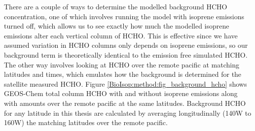     
    There are a couple of ways to determine the modelled background HCHO concentration, one of which involves running the model with isoprene emissions turned off, which allows us to see exactly how much the modelled isoprene emissions alter each vertical column of HCHO.
    This is effective since we have assumed variation in HCHO columns only depends on isoprene emissions, so our background term is theoretically identical to the emission free simulated HCHO.
    The other way involves looking at HCHO over the remote pacific at matching latitudes and times, which emulates how the background is determined for the satellite measured HCHO.
    Figure \ref{BioIsop:method:fig_background_hcho} shows GEOS-Chem total column HCHO with and without isoprene emissions along with amounts over the remote pacific at the same latitudes.
    Background HCHO for any latitude in this thesis are calculated by averaging longitudinally (140\degr W to 160\degr W) the matching latitudes over the remote pacific.
    
    
    
